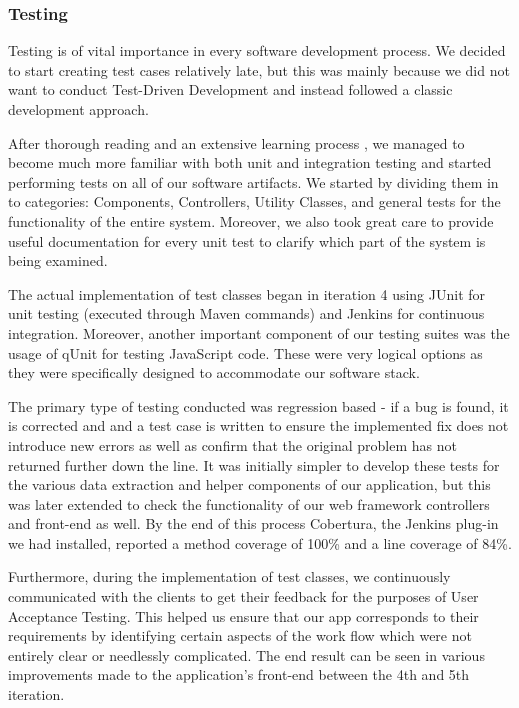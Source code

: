 \documentclass{l3proj}
\begin{document}
\subsubsection{Testing}
\label{sec:testing}
Testing is of vital importance in every software development process. We decided to start creating test cases relatively late, but this was mainly because we did not want to conduct Test-Driven Development and instead followed a classic development approach.

After thorough reading and an extensive learning process \cite{JUnit-In-Action}\cite{Effective-Testing}\cite{Hints-On-Test}, we managed to become much more familiar with both unit and integration testing and started performing tests on all of our software artifacts. We started by dividing them in to categories: Components, Controllers, Utility Classes, and general tests for the functionality of the entire system. Moreover, we also took great care to provide useful documentation for every unit test to clarify which part of the system is being examined.

The actual implementation of test classes began in iteration 4 using JUnit for unit testing (executed through Maven commands) and Jenkins for continuous integration. Moreover, another important component of our testing suites was the usage of qUnit for testing JavaScript code. These were very logical options as they were specifically designed to accommodate our software stack.

The primary type of testing conducted was regression based - if a bug is found, it is corrected and and a test case is written to ensure the implemented fix does not introduce new errors as well as confirm that the original problem has not returned further down the line. It was initially simpler to develop these tests for the various data extraction and helper components of our application, but this was later extended to check the functionality of our web framework controllers and front-end as well. By the end of this process Cobertura, the Jenkins plug-in we had installed, reported a method coverage of 100\% and a line coverage of 84\%.

Furthermore, during the implementation of test classes, we continuously communicated with the clients to get their feedback for the purposes of User Acceptance Testing. This helped us ensure that our app corresponds to their requirements by identifying certain aspects of the work flow which were not entirely clear or needlessly complicated. The end result can be seen in various improvements made to the application's front-end between the 4th and 5th iteration. 
\end{document}
